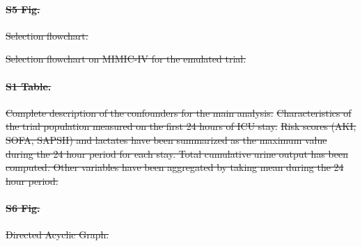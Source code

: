 \documentclass[10pt,letterpaper]{article}
\providecommand{\DIFdeltex}[1]{{\protect\color{red}\sout{#1}}}                      %
\providecommand{\DIFdelFL}[1]{\DIFdel{#1}} %
\providecommand{\DIFdel}[1]{\texorpdfstring{\DIFdeltex{#1}}{}} %
\begin{document}
\paragraph*{\DIFdel{S5 Fig.}}
\DIFdel{Selection flowchart.}%

{%
  \DIFdelFL{Selection flowchart on MIMIC-IV for the emulated trial.}}%

\paragraph*{\DIFdel{S1 Table.}}
\DIFdel{Complete description of the confounders for the main analysis.}%
{%
  \DIFdelFL{Characteristics of the trial population measured on the first 24
    hours of ICU stay. }%
  \DIFdelFL{Risk scores (AKI, SOFA, SAPSII) and lactates have been summarized as the
    maximum value during the 24 hour period for each stay. Total cumulative urine output has
    been computed. Other variables have been aggregated by taking mean during
    the 24 hour period.}}%

\paragraph*{\DIFdel{S6 Fig.}}
\DIFdel{Directed Acyclic Graph.}%
\end{document}
